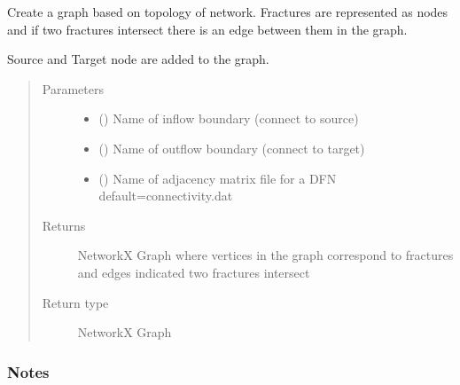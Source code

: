 \documentclass[letterpaper,10pt,english]{sphinxmanual}
\begin{document}

\begin{fulllineitems}
\label{\detokenize{pydfnworks:pydfnworks.dfnGraph.dfn2graph.create_fracture_graph}}
Create a graph based on topology of network. Fractures
are represented as nodes and if two fractures intersect
there is an edge between them in the graph.

Source and Target node are added to the graph.
\begin{quote}\begin{description}
\item[{Parameters}] \leavevmode\begin{itemize}
\item {} 
 () \textendash{} Name of inflow boundary (connect to source)

\item {} 
 () \textendash{} Name of outflow boundary (connect to target)

\item {} 
 () \textendash{} Name of adjacency matrix file for a DFN default=connectivity.dat

\end{itemize}

\item[{Returns}] \leavevmode
{} \textendash{} NetworkX Graph where vertices in the graph correspond to fractures and edges indicated two fractures intersect

\item[{Return type}] \leavevmode
NetworkX Graph

\end{description}\end{quote}
\subsubsection*{Notes}

\end{fulllineitems}
\end{document}
